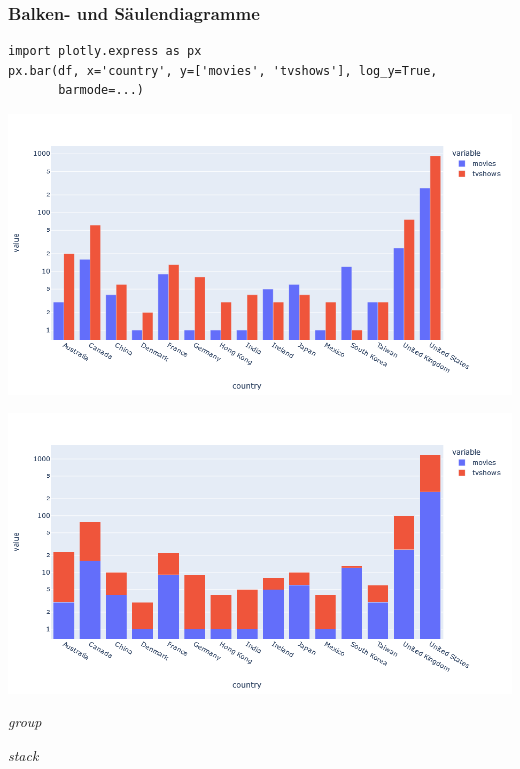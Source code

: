 \begin{frame}[fragile]
\frametitle{Balken- und Säulendiagramme}

\begin{verbatim}
import plotly.express as px
px.bar(df, x='country', y=['movies', 'tvshows'], log_y=True,
       barmode=...)
\end{verbatim}

\begin{minipage}{0.5\textwidth}%
\begin{center}%
\includegraphics[width=\linewidth]{fig5/bar3.png}%
\end{center}%
\end{minipage}%
\begin{minipage}{0.5\textwidth}%
\begin{center}%
\includegraphics[width=\linewidth]{fig5/bar4.png}%
\end{center}%
\end{minipage}%

\begin{minipage}{0.5\textwidth}%
\begin{center}%
\scriptsize \textit{group}
\end{center}%
\end{minipage}%
\begin{minipage}{0.5\textwidth}%
\begin{center}%
\scriptsize \textit{stack}
\end{center}%
\end{minipage}%
\end{frame}


